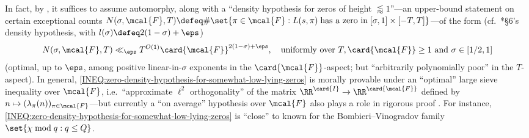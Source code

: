 \documentclass[12pt]{report}
\begin{document}
In fact, by \cite{density_beats_hua_when},
it suffices to assume automorphy,
along with a ``density hypothesis for zeros of height $\lessapprox 1$''---an upper-bound statement
on certain exceptional counts $N(\sigma,\mcal{F},T)
\defeq\#\set{\pi\in\mcal{F}:L(s,\pi)\;\textnormal{has a zero in}\;[\sigma,1]\times[-T,T]}$---of the form
(cf.~\cite{density_beats_hua_when}*{\S6's density hypothesis, with $l(\sigma)\defeq 2(1-\sigma)+\eps$})
\begin{equation}
\label{INEQ:zero-density-hypothesis-for-somewhat-low-lying-zeros}
N(\sigma,\mcal{F},T)\ll_\eps T^{O(1)}\card{\mcal{F}}^{2(1-\sigma)+\eps},
\quad\textnormal{uniformly over $T,\card{\mcal{F}}\geq1$ and $\sigma\in[1/2,1]$}
\end{equation}
(optimal, up to $\eps$, among positive linear-in-$\sigma$ exponents in the $\card{\mcal{F}}$-aspect;
but ``arbitrarily polynomially poor'' in the $T$-aspect).
In general, \eqref{INEQ:zero-density-hypothesis-for-somewhat-low-lying-zeros} is morally provable under an ``optimal'' large sieve inequality over $\mcal{F}$,
i.e.~``approximate $\ell^2$ orthogonality'' of the matrix $\RR^{\card{I}}\to\RR^{\card{\mcal{F}}}$ defined by $n\mapsto (\lambda_\pi(n))_{\pi\in\mcal{F}}$---but currently a ``\Lindelof on average'' hypothesis over $\mcal{F}$ also plays a role in rigorous proof \cite{axiomatize_bombieri-huxley}.
For instance, \eqref{INEQ:zero-density-hypothesis-for-somewhat-low-lying-zeros} is ``close'' to known for the Bombieri--Vinogradov family $\set{\chi\bmod{q}: q\leq Q}$.
\end{document}
